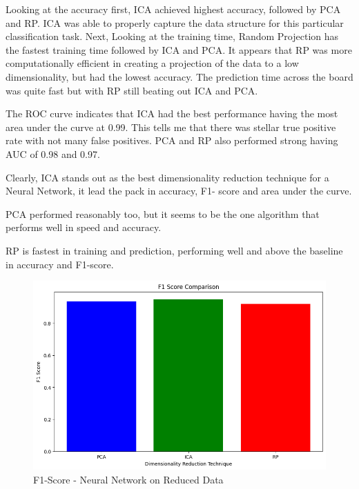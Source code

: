 \documentclass[conference]{IEEEtran}
\begin{document}
\par Looking at the accuracy first, ICA achieved highest accuracy, followed by PCA and RP. ICA was able to properly capture the data structure for this particular classification task. Next, Looking at the training time, Random Projection has the fastest training time followed by ICA and PCA. It appears that RP was more computationally efficient in creating a projection of the data to a low dimensionality, but had the lowest accuracy. The prediction time across the board was quite fast but with RP still beating out ICA and PCA. 
\par The ROC curve indicates that ICA had the best performance having the most area under the curve at 0.99. This tells me that there was stellar true positive rate with not many false positives. PCA and RP also performed strong having AUC of 0.98 and 0.97. 
\par Clearly, ICA stands out as the best dimensionality reduction technique for a Neural Network, it lead the pack in accuracy, F1- score and area under the curve.
\par PCA performed reasonably too, but it seems to be the one algorithm that performs well in speed and accuracy.
\par RP is fastest in training and prediction, performing well and above the baseline in accuracy and F1-score.
\begin{figure}
    \centering
    \includegraphics[width=1\linewidth]{figures//housing_figures/f1_dim_reduction.png}
    \caption{F1-Score - Neural Network on Reduced Data}
    \label{fig:enter-label}
\end{figure}
\end{document}
